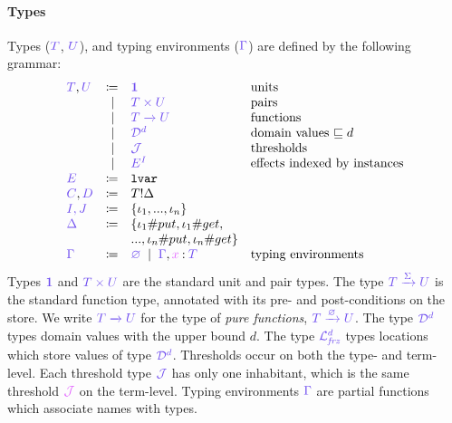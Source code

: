\documentclass[main.tex]{subfiles}
\begin{document}
\paragraph*{Types}
Types ($\ty{T}$, $\ty{U}$),  and typing environments ($\ty{\Gamma}$) are defined by the following grammar:
\[
\begin{array}{lrll}
  \ty{T}, \ty{U}
  & \coloneqq & \ty{\tyunit}                              & \text{units}\\
  & \sep      & \ty{\typrod{T}{U}}                        & \text{pairs}\\
  & \sep      & \ty{\tyfun{T}{U}}            & \text{functions}\\
  & \sep      & \ty{\tyD{d}}                              & \text{domain values }{\sqsubseteq d}\\
  & \sep      & \ty{\tyJ}                                 & \text{thresholds} \\
  & \sep     & \ty{E^I}                                   & \text{effects indexed by instances}
  \\
  \ty{E}
  & \coloneqq  & \texttt{lvar}
  \\
  \ty{C}, \ty{D}
  & \coloneqq & T ! \Delta
  \\
  \ty{I, J}
  & \coloneqq & \{\iota_1, ..., \iota_n\}
  \\
  \ty{\Delta}
  & \coloneqq & \{\iota_1\#put, \iota_1\#get, \\
  & &                   ..., \iota_n\#put, \iota_n\#get\}
  \\
  \ty{\Gamma}
  & \coloneqq & \ty{\envemp}
    \sep        \envext{\ty{\Gamma}}{x}{T}                & \text{typing environments}
  \\

\end{array}
\]
Types $\ty{\tyunit}$ and $\ty{\typrod{T}{U}}$ are the standard unit and pair types.
The type $\ty{\tyfun[\ty{\Sigma}]{T}{U}}$ is the standard function type, annotated with its pre- and post-conditions on the store. We write $\ty{\tyfun{T}{U}}$ for the type of \emph{pure functions}, \ie $\ty{\tyfun[\envemp]{T}{U}}$.
The type $\tyD{d}$ types domain values with the upper bound $d$.
The type $\tyL{\frz}{d}$ types locations which store values of type $\tyD{d}$.
Thresholds occur on both the type- and term-level. Each threshold type $\tyJ$ has only one inhabitant, which is the same threshold $\tmJ$ on the term-level.
Typing environments $\ty{\Gamma}$ are partial functions which associate names with types.
\end{document}
